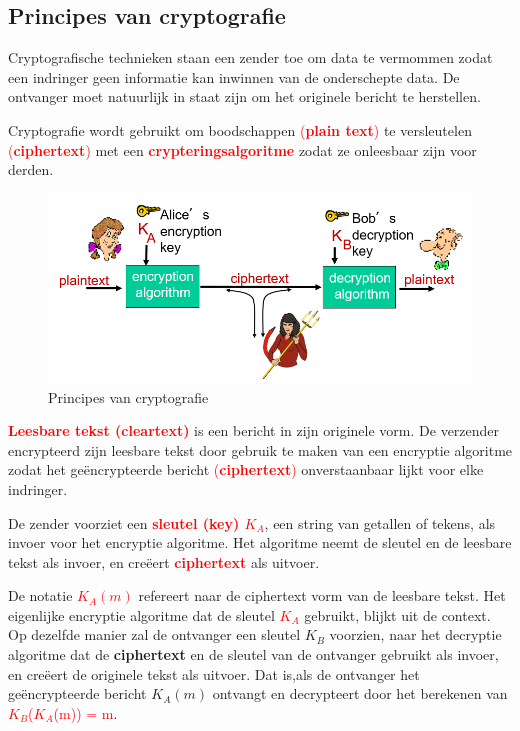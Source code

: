 \subsection{Principes van cryptografie}
\noindent Cryptografische technieken staan een zender toe om data te vermommen zodat een indringer geen informatie kan inwinnen van de onderschepte data. De ontvanger moet natuurlijk in staat zijn om het originele bericht te herstellen.

\noindent Cryptografie wordt gebruikt om boodschappen \textcolor{red}{(\textbf{plain text})} te versleutelen \textcolor{red}{(\textbf{ciphertext})} met een \textcolor{red}{\textbf{crypteringsalgoritme}} zodat ze onleesbaar zijn voor derden.

\begin{figure}[h]
    \centering
    \includegraphics[width=7in]{./img/imghfdst8/hfdst8puntje2.png}
    \caption{Principes van cryptografie }      
    \label{fig:Principes van cryptografie }
\end{figure}

\noindent \textcolor{red}{\textbf{Leesbare tekst (cleartext)}} is een bericht in zijn originele vorm. De verzender encrypteerd zijn leesbare tekst door gebruik te maken van een encryptie algoritme zodat het geëncrypteerde bericht \textcolor{red}{(\textbf{ciphertext})} onverstaanbaar lijkt voor elke indringer. 

\noindent De zender voorziet een \textcolor{red}{\textbf{sleutel (key) $K_A$}}, een string van getallen of tekens, als invoer voor het encryptie algoritme. Het algoritme neemt de sleutel en de leesbare tekst als invoer, en creëert \textcolor{red}{\textbf{ciphertext}} als uitvoer.

\noindent De notatie \textcolor{red}{$K_A (m)$} refereert naar de ciphertext vorm van de leesbare tekst. Het eigenlijke encryptie algoritme dat de sleutel \textcolor{red}{$K_A $} gebruikt, blijkt uit de context.
Op dezelfde manier zal de ontvanger een sleutel $K_B$ voorzien, naar het decryptie algoritme dat de \textbf{ciphertext} en de sleutel van de ontvanger gebruikt als invoer, en creëert de originele tekst als uitvoer.
Dat is,als de ontvanger het geëncrypteerde bericht $K_A (m) $ ontvangt en decrypteert door het berekenen van \textcolor{red}{$K_B$($K_A$(m)) = m}.


